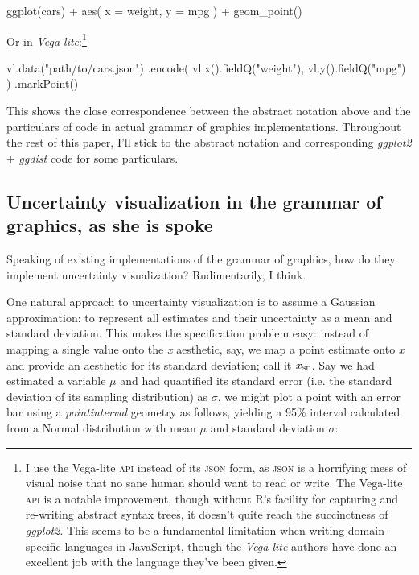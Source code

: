 \documentclass[journal]{vgtc}                     %
\newenvironment{centerverbatim}{%
  \hfill\break
  \small
  \centering
  \varwidth{\linewidth}%
  \verbatim
}{%
  \endverbatim
  \endvarwidth
  \par
  \hfill\break
}
\begin{document}
\begin{centerverbatim}
ggplot(cars) +
  aes(
    x = weight,
    y = mpg
  ) +
  geom_point()
\end{centerverbatim}

Or in \textit{Vega-lite}:\footnote{I use the Vega-lite \textsc{api} instead of its \textsc{json} form, as \textsc{json} is a horrifying mess of visual noise that no sane human should want to read or write. The Vega-lite \textsc{api} is a notable improvement, though without R's facility for capturing and re-writing abstract syntax trees, it doesn't quite reach the succinctness of \textit{ggplot2}. This seems to be a fundamental limitation when writing domain-specific languages in JavaScript, though the \textit{Vega-lite} authors have done an excellent job with the language they've been given.}

\begin{centerverbatim}
vl.data("path/to/cars.json")
  .encode(
    vl.x().fieldQ("weight"),
    vl.y().fieldQ("mpg")
  )
  .markPoint()
\end{centerverbatim}

This shows the close correspondence between the abstract notation above and the particulars of code in actual grammar of graphics implementations. Throughout the rest of this paper, I'll stick to the abstract notation and corresponding \textit{ggplot2} + \textit{ggdist} code for some particulars.

\subsection{Uncertainty visualization in the grammar of graphics, as she is spoke}

Speaking of existing implementations of the grammar of graphics, how do they implement uncertainty visualization? Rudimentarily, I think.

One natural approach to uncertainty visualization is to assume a Gaussian approximation: to represent all estimates and their uncertainty as a mean and standard deviation. This makes the specification problem easy: instead of mapping a single value onto the \textit{x} aesthetic, say, we map a point estimate onto \textit{x} and provide an aesthetic for its standard deviation; call it $x_\textsc{sd}$. Say we had estimated a variable $\mu$ and had quantified its standard error (i.e. the standard deviation of its sampling distribution) as $\sigma$, we might plot a point with an error bar using a \textit{pointinterval} geometry as follows, yielding a 95\% interval calculated from a Normal distribution with mean $\mu$ and standard deviation $\sigma$:
\end{document}
